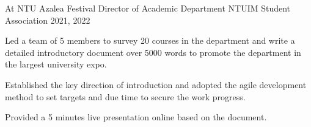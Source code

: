 

\begin{cventries}

%


  \cventry
    {At NTU Azalea Festival} %
    {Director of Academic Department} %
    {NTUIM Student Association} %
    {2021, 2022} %
    {
      \begin{cvitems} %
        \item {Led a team of 5 members to survey 20 courses in the department
            and write a detailed introductory document over 5000 words
            to promote the department in the largest university expo.}
        \item Established the key direction of introduction and adopted the agile
            development method to set targets and due time to secure the work progress.
        \item Provided a 5 minutes live presentation online based on the document.
      \end{cvitems}
    }


\end{cventries}
